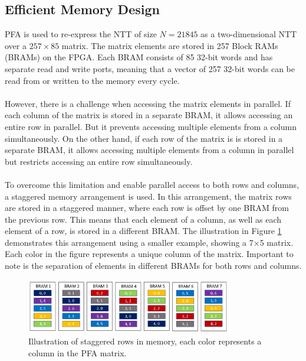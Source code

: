 \documentclass[english,master=eelt,masteroption=ec]{kulemt}
\begin{document}
\subsection{Efficient Memory Design}
PFA is used to re-express the NTT of size $N = 21845$ as a two-dimensional NTT over a $257\times 85$ matrix. The matrix elements are stored in 257 Block RAMs (BRAMs) on the FPGA. Each BRAM consists of 85 32-bit words and has separate read and write ports, meaning that a vector of 257 32-bit words can be read from or written to the memory every cycle.
\\\\
However, there is a challenge when accessing the matrix elements in parallel. If each column of the matrix is stored in a separate BRAM, it allows accessing an entire row in parallel. But it prevents accessing multiple elements from a column simultaneously. On the other hand, if each row of the matrix is is stored in a separate BRAM, it allows accessing multiple elements from a column in parallel but restricts accessing an entire row simultaneously.
\\\\
To overcome this limitation and enable parallel access to both rows and columns, a staggered memory arrangement is used. In this arrangement, the matrix rows are stored in a staggered manner, where each row is offset by one BRAM from the previous row. This means that each element of a column, as well as each element of a row, is stored in a different BRAM. The illustration in Figure \ref{fig:staggered_memory} demonstrates this arrangement using a smaller example, showing a 7×5 matrix. Each color in the figure represents a unique column of the matrix. Important to note is the separation of elements in different BRAMs for both rows and columns.

\begin{figure}[h]
\centering
\includegraphics[width=0.8\textwidth]{img/staggered_memory.png}
\caption{Illustration of staggered rows in memory, each color represents a column in the PFA matrix.}
\label{fig:staggered_memory}
\end{figure}

\FloatBarrier
\end{document}
